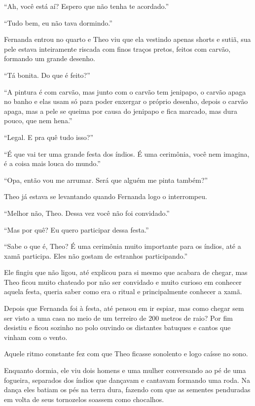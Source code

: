 ``Ah, você está aí? Espero que não tenha te acordado.''

``Tudo bem, eu não tava dormindo.''

Fernanda entrou no quarto e Theo viu que ela vestindo apenas shorts e
sutiã, sua pele estava inteiramente riscada com finos traços pretos,
feitos com carvão, formando um grande desenho.

``Tá bonita. Do que é feito?''

``A pintura é com carvão, mas junto com o carvão tem jenipapo, o carvão
apaga no banho e elas usam só para poder enxergar o próprio desenho,
depois o carvão apaga, mas a pele se queima por causa do jenipapo e fica
marcado, mas dura pouco, que nem hena.''

``Legal. E pra quê tudo isso?''

``É que vai ter uma grande festa dos índios. É uma cerimônia, você nem
imagina, é a coisa mais louca do mundo.''

``Opa, então vou me arrumar. Será que alguém me pinta também?''

Theo já estava se levantando quando Fernanda logo o interrompeu.

``Melhor não, Theo. Dessa vez você não foi convidado.''

``Mas por quê? Eu quero participar dessa festa.''

``Sabe o que é, Theo? É uma cerimônia muito importante para os índios,
até a xamã participa. Eles não gostam de estranhos participando.''

Ele fingiu que não ligou, até explicou para si mesmo que acabara de
chegar, mas Theo ficou muito chateado por não ser convidado e muito
curioso em conhecer aquela festa, queria saber como era o ritual e
principalmente conhecer a xamã.

Depois que Fernanda foi à festa, até pensou em ir espiar, mas como
chegar sem ser visto a uma casa no meio de um terreiro de 200 metros de
raio? Por fim desistiu e ficou sozinho no polo ouvindo os distantes
batuques e cantos que vinham com o vento.

\asterisc


Aquele ritmo constante fez com que Theo ficasse sonolento e logo caísse
no sono.

Enquanto dormia, ele viu dois homens e uma mulher conversando ao pé de
uma fogueira, separados dos índios que dançavam e cantavam formando uma
roda. Na dança eles batiam os pés na terra dura, fazendo com que as
sementes penduradas em volta de seus tornozelos soassem como chocalhos.


